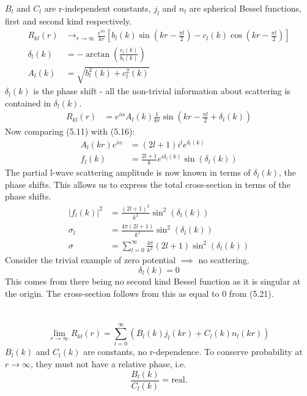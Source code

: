 \documentclass[a4paper, 11pt, normalem]{report}
\begin{document}
$B_l$ and $C_l$ are r-independent constants, $j_l$ and $n_l$ are spherical Bessel functions, first and second kind respectively.
\begin{align}
    R_{kl}(r) &\to_{r\to\infty} \frac{e^{i\alpha}}{kr}\left[b_l(k)\sin\left(kr - \frac{\pi l}{2}\right) - c_l(k)\cos\left(kr-\frac{\pi l}{2}\right)\right] \\
    \delta_l(k) &= -\arctan\left(\frac{c_l(k)}{b_l(k)}\right) \\
    A_l(k) &= \sqrt{b_l^2(k) + c_l^2(k)}
\end{align}
$\delta_l(k)$ is the phase shift - all the non-trivial information about scattering is contained in $\delta_l(k)$.
\begin{align}  
    R_{kl}(r) &= e^{i\alpha}A_l(k)\frac{1}{kr}\sin\left(kr - \frac{\pi l}{2} + \delta_l(k)\right)
\end{align}
Now comparing (5.11) with (5.16):
\begin{align}
    A_l(kr)e^{i\alpha} &= (2l+1)i^le^{\delta_l(k)} \\
    f_l(k) &= \frac{2l+1}{k}e^{i\delta_l(k)}\sin(\delta_l(k))
\end{align}
The partial l-wave scattering amplitude is now known in terms of $\delta_l(k)$, the phase shifts.
This allows us to express the total cross-section in terms of the phase shifts. 
\begin{align}
    |f_l(k)|^2 &= \frac{(2l+1)^2}{k^2}\sin^2(\delta_l(k)) \\
    \sigma_l &= \frac{4\pi(2l+1)}{k^2}\sin^2(\delta_l(k)) \\
    \sigma &= \sum_{l=0}^\infty \frac{4\pi}{k^2}(2l+1)\sin^2(\delta_l(k))
\end{align}
Consider the trivial example of zero potential $\implies$ no scattering.
\begin{equation}
    \delta_l(k) = 0
\end{equation}
This comes from there being no second kind Bessel function as it is singular at the origin.
The cross-section follows from this as equal to 0 from (5.21).

\chapter{}
\begin{equation}
    \lim_{r\to\infty} R_{kl}(r) = \sum_{l=0}^\infty \left(B_l(k)j_l(kr) + C_l(k)n_l(kr)\right)
\end{equation}
$B_l(k)$ and $C_l(k)$ are constants, no r-dependence.
To conserve probability at $r\to\infty$, they must not have a relative phase, i.e.
\begin{equation}
    \frac{B_l(k)}{C_l(k)} = \text{real.}
\end{equation}
\end{document}
